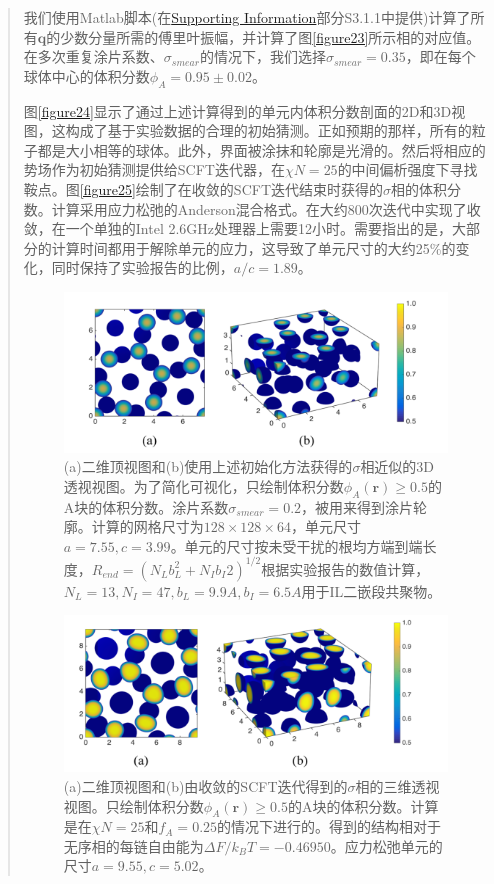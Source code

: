 \documentclass{article}
\begin{document}
\begin{CJK}{UTF8}{gkai}
\begin{quotation}
我们使用Matlab脚本(在\href{http://pubs.acs.org/doi/suppl/10.1021/acs.macromol.6b00107/suppl_file/ma6b00107_si_001.pdf}{Supporting Information}部分S3.1.1中提供)计算了所有$\mathbf{q}$的少数分量所需的傅里叶振幅，并计算了图\ref{figure23}所示相的对应值。在多次重复涂片系数、$\sigma _{smear}$的情况下，我们选择$\sigma _{smear}=0.35$，即在每个球体中心的体积分数$\phi _A=0.95\pm0.02$。

图\ref{figure24}显示了通过上述计算得到的单元内体积分数剖面的2D和3D视图，这构成了基于实验数据的合理的初始猜测。正如预期的那样，所有的粒子都是大小相等的球体。此外，界面被涂抹和轮廓是光滑的。然后将相应的势场作为初始猜测提供给SCFT迭代器，在$\chi N=25$的中间偏析强度下寻找鞍点。图\ref{figure25}绘制了在收敛的SCFT迭代结束时获得的$\sigma$相的体积分数。计算采用应力松弛的Anderson混合格式。在大约800次迭代中实现了收敛，在一个单独的Intel 2.6GHz处理器上需要12小时。需要指出的是，大部分的计算时间都用于解除单元的应力，这导致了单元尺寸的大约25\%的变化，同时保持了实验报告的比例，$a/c=1.89$。
\begin{figure}[H]
	\centering
	\includegraphics[scale=0.5]{./figures/24.png}
	\caption{(a)二维顶视图和(b)使用上述初始化方法获得的$\sigma$相近似的3D透视视图。为了简化可视化，只绘制体积分数$\phi _A(\mathbf{r})\geq 0.5$的A块的体积分数。涂片系数$\sigma_{smear}=0.2$，被用来得到涂片轮廓。计算的网格尺寸为$128\times 128\times 64$，单元尺寸$a=7.55,c=3.99$。单元的尺寸按未受干扰的根均方端到端长度，$R_{end}=(N_L b_L^2 + N_I b_I 2)^{1/2}$根据实验报告的数值计算，$N_L=13,N_I=47,b_L=9.9A,b_I=6.5A$用于IL二嵌段共聚物。}
	\label{figure4}
\end{figure}

\begin{figure}[H]
	\centering
	\includegraphics[scale=0.5]{./figures/25.png}
	\caption{(a)二维顶视图和(b)由收敛的SCFT迭代得到的$\sigma$相的三维透视视图。只绘制体积分数$\phi _A(\mathbf{r})\geq 0.5$的A块的体积分数。计算是在$\chi N=25$和$f_A=0.25$的情况下进行的。得到的结构相对于无序相的每链自由能为$\Delta F/k_BT=-0.46950$。应力松弛单元的尺寸$a=9.55,c=5.02$。}
	\label{figure5}
\end{figure}


\end{quotation}
\end{CJK}
\end{document}
